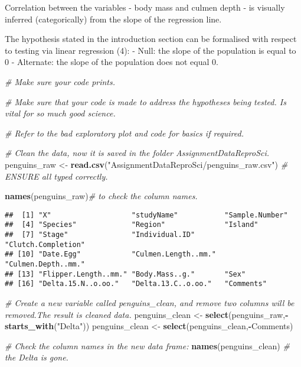 \documentclass[
]{article}
\newenvironment{Shaded}{\begin{snugshade}}{\end{snugshade}}
\newcommand{\CommentTok}[1]{\textcolor[rgb]{0.56,0.35,0.01}{\textit{#1}}}
\newcommand{\FunctionTok}[1]{\textcolor[rgb]{0.13,0.29,0.53}{\textbf{#1}}}
\newcommand{\NormalTok}[1]{#1}
\newcommand{\OtherTok}[1]{\textcolor[rgb]{0.56,0.35,0.01}{#1}}
\newcommand{\SpecialCharTok}[1]{\textcolor[rgb]{0.81,0.36,0.00}{\textbf{#1}}}
\newcommand{\StringTok}[1]{\textcolor[rgb]{0.31,0.60,0.02}{#1}}
\begin{document}
Correlation between the variables - body mass and culmen depth - is
visually inferred (categorically) from the slope of the regression line.

The hypothesis stated in the introduction section can be formalised with
respect to testing via linear regression (4): - Null: the slope of the
population is equal to 0 - Alternate: the slope of the population does
not equal 0.

\begin{Shaded}
\begin{Highlighting}[]
\CommentTok{\# Make sure your code prints. }

\CommentTok{\# Make sure that your code is made to address the hypotheses being tested. Is vital for so much good science.}

\CommentTok{\# Refer to the bad exploratory plot and code for basics if required.}

\CommentTok{\# Clean the data, now it is saved in the folder AssignmentDataReproSci. }
\NormalTok{penguins\_raw }\OtherTok{\textless{}{-}} \FunctionTok{read.csv}\NormalTok{(}\StringTok{"AssignmentDataReproSci/penguins\_raw.csv"}\NormalTok{) }\CommentTok{\# ENSURE all typed correctly.}

\FunctionTok{names}\NormalTok{(penguins\_raw)}\CommentTok{\# to check the column names.}
\end{Highlighting}
\end{Shaded}

\begin{verbatim}
##  [1] "X"                   "studyName"           "Sample.Number"      
##  [4] "Species"             "Region"              "Island"             
##  [7] "Stage"               "Individual.ID"       "Clutch.Completion"  
## [10] "Date.Egg"            "Culmen.Length..mm."  "Culmen.Depth..mm."  
## [13] "Flipper.Length..mm." "Body.Mass..g."       "Sex"                
## [16] "Delta.15.N..o.oo."   "Delta.13.C..o.oo."   "Comments"
\end{verbatim}

\begin{Shaded}
\begin{Highlighting}[]
\CommentTok{\# Create a new variable called penguins\_clean, and remove two columns will be removed.The result is cleaned data.}
\NormalTok{penguins\_clean }\OtherTok{\textless{}{-}} \FunctionTok{select}\NormalTok{(penguins\_raw,}\SpecialCharTok{{-}}\FunctionTok{starts\_with}\NormalTok{(}\StringTok{"Delta"}\NormalTok{))}
\NormalTok{penguins\_clean }\OtherTok{\textless{}{-}} \FunctionTok{select}\NormalTok{(penguins\_clean,}\SpecialCharTok{{-}}\NormalTok{Comments)}

\CommentTok{\# Check the column names in the new data frame:}
\FunctionTok{names}\NormalTok{(penguins\_clean) }\CommentTok{\# the Delta is gone. }
\end{Highlighting}
\end{Shaded}
\end{document}
